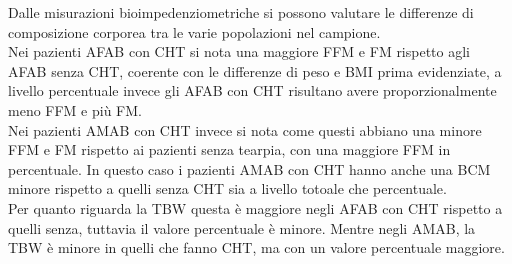 \documentclass[12pt]{article}
\begin{document}
Dalle misurazioni bioimpedenziometriche si possono valutare le differenze di composizione corporea tra le varie popolazioni nel campione.\\
Nei pazienti AFAB con CHT si nota una maggiore FFM e FM rispetto agli AFAB senza CHT, coerente con le differenze di peso e BMI prima evidenziate, a livello percentuale invece gli AFAB con CHT risultano avere proporzionalmente meno FFM e più FM. \\
Nei pazienti AMAB con CHT invece si nota come questi abbiano una minore FFM e FM rispetto ai pazienti senza tearpia, con una maggiore FFM in percentuale. In questo caso i pazienti AMAB con CHT hanno anche una BCM minore rispetto a quelli senza CHT sia a livello totoale che percentuale. \\
Per quanto riguarda la TBW questa è maggiore negli AFAB con CHT rispetto a quelli senza, tuttavia il valore percentuale è minore. Mentre negli AMAB, la TBW è minore in quelli che fanno CHT, ma con un valore percentuale maggiore.
\end{document}
